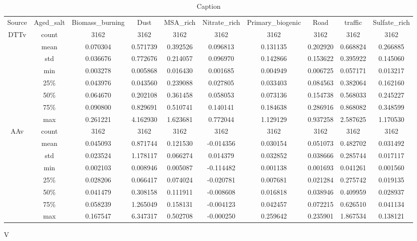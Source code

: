\begin{table}[ht]
    \centering
    \begin{tabular}{cccccccccc}
    Source & Aged_salt & Biomass_burning & Dust        & MSA_rich    & Nitrate_rich & Primary_biogenic & Road        & traffic     & Sulfate_rich\\
\multirow{7}{*}{DTTv}   & count     & 3162     & 3162 & 3162 & 3162  & 3162      & 3162 & 3162 & 3162\\
       & mean      & 0.070304        & 0.571739    & 0.392526    & 0.096813     & 0.131135         & 0.202920    & 0.668824    & 0.266885\\
       & std       & 0.036676        & 0.772676    & 0.214057    & 0.096970     & 0.142866         & 0.153622    & 0.395922    & 0.145060\\
       & min       & 0.003278        & 0.005868    & 0.016430    & 0.001685     & 0.004949         & 0.006725    & 0.057171    & 0.013217\\
       & 25\%      & 0.043976        & 0.043560    & 0.239088    & 0.027805     & 0.033403         & 0.084563    & 0.382064    & 0.162160\\
       & 50\%      & 0.064670        & 0.202108    & 0.361458    & 0.058053     & 0.073136         & 0.154738    & 0.568033    & 0.245227\\
       & 75\%      & 0.090800        & 0.829691    & 0.510741    & 0.140141     & 0.184638         & 0.286916    & 0.868082    & 0.348599\\
       & max       & 0.261221        & 4.162930    & 1.623681    & 0.772044     & 1.129129         & 0.937258    & 2.587625    & 1.170530\\
AAv    & count     & 3162     & 3162 & 3162 & 3162  & 3162      & 3162 & 3162 & 3162\\
       & mean      & 0.045093        & 0.871744    & 0.121530    & -0.014356    & 0.030154         & 0.051073    & 0.482702    & 0.031492\\
       & std       & 0.023524        & 1.178117    & 0.066274    & 0.014379     & 0.032852         & 0.038666    & 0.285744    & 0.017117\\
       & min       & 0.002103        & 0.008946    & 0.005087    & -0.114482    & 0.001138         & 0.001693    & 0.041261    & 0.001560\\
       & 25\%      & 0.028206        & 0.066417    & 0.074024    & -0.020781    & 0.007681         & 0.021284    & 0.275742    & 0.019135\\
       & 50\%      & 0.041479        & 0.308158    & 0.111911    & -0.008608    & 0.016818         & 0.038946    & 0.409959    & 0.028937\\
       & 75\%      & 0.058239        & 1.265049    & 0.158131    & -0.004123    & 0.042457         & 0.072215    & 0.626510    & 0.041134\\
       & max       & 0.167547        & 6.347317    & 0.502708    & -0.000250    & 0.259642         & 0.235901    & 1.867534    & 0.138121\\
    \end{tabular}
    \caption{Caption}
    \label{tab:my_label}
\end{table}V


